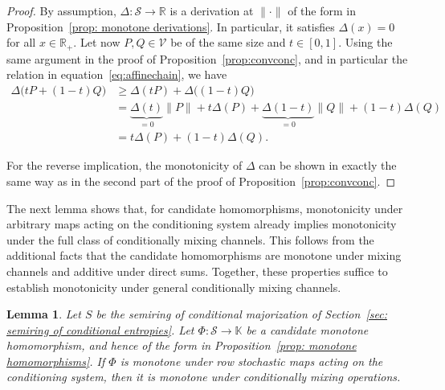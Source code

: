 \documentclass[aps,pra,11pt,onecolumn,nofootinbib,tightenlines]{revtex4-2}
\newtheorem{lemma}[theorem]{Lemma}
\theoremstyle{definition}
\newcommand{\cS}{\mathcal{S}}
\newcommand{\V}{\mathcal{V}}
\newcommand{\mb}[1]{\mathbb{#1}}
\begin{document}
\begin{proof}
By assumption, $\Delta:\cS\to\mb R$ is a derivation at $\|\cdot\|$ of the form in Proposition~\ref{prop: monotone derivations}. In particular, it satisfies $\Delta(x)=0$ for all $x\in\mb R_+$. Let now $P,Q\in\V$ be of the same size and $t\in[0,1]$. Using the same argument in the proof of Proposition~\ref{prop:convconc}, and in particular the relation in equation~\eqref{eq:affinechain}, we have
\begin{align}
\Delta\big(tP+(1-t)Q\big)&\geq\Delta(tP)+\Delta\big((1-t)Q\big)\\
&=\underbrace{\Delta(t)}_{=0}\|P\|+t\Delta(P)+\underbrace{\Delta(1-t)}_{=0}\|Q\|+(1-t)\Delta(Q)\\
&=t\Delta(P)+(1-t)\Delta(Q).
\end{align}

For the reverse implication, the monotonicity of $\Delta$ can be shown in exactly the same way as in the second part of the proof of Proposition~\ref{prop:convconc}.
\end{proof}

The next lemma shows that, for candidate homomorphisms, monotonicity under arbitrary maps acting on the conditioning system already implies monotonicity under the full class of conditionally mixing channels. This follows from the additional facts that the candidate homomorphisms are monotone under mixing channels and additive under direct sums. Together, these properties suffice to establish monotonicity under general conditionally mixing channels.
\begin{lemma}
\label{lem: extension to general channels}
Let $S$ be the semiring of conditional majorization of Section~\ref{sec: semiring of conditional entropies}.
Let $\Phi: \cS \to \mathbb{K}$ be a candidate monotone homomorphism, and hence of the form in Proposition~\ref{prop: monotone homomorphisms}. If $\Phi$ is monotone under row stochastic maps acting on the conditioning system, then it is monotone under conditionally mixing operations.
\end{lemma}
\end{document}
